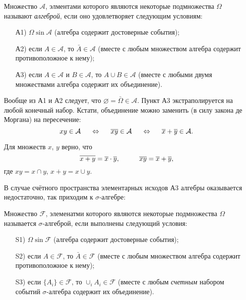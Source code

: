 \begin{to_def}
    Множество $\mathcal A$, элментами которого являются некоторые подмножества $\Omega$ называют \textit{алгеброй}, если оно удовлетворяет следующим условиям:
    \begin{itemize}
        \item[А1)] $\Omega \sin \mathcal A$ 
        (алгебра содержит достоверные события);
        \item[А2)] если $A \in \mathcal A$, то $\bar{A} \in \mathcal A$ 
        (вместе с любым множеством алгебра содержит противоположное к нему);
        \item[А3)] если $A \in \mathcal A$ и $B \in \mathcal A$, то $A \cup B \in \mathcal A$ 
        (вместе с любыми двумя множествами алгебра содержит их объединение).
    \end{itemize}
\end{to_def}


Вообще из А1 и А2 следует, что $\varnothing = \bar{\Omega} \in \mathcal A$. Пункт А3 экстраполируется на любой конечный набор. Кстати, объединение можно заменить (в силу закона де Моргана) на пересечение:
\begin{equation*}
    xy \in \mathcal A
    \hspace{0.5cm} \Leftrightarrow \hspace{0.5cm}
    \overline{xy} \in \mathcal A
    \hspace{0.5cm} \Leftrightarrow \hspace{0.5cm}
    \overline{x} + \overline{y} \in \mathcal A.
\end{equation*}

\begin{to_thr}
    Для множеств $x$, $y$ верно, что
    \begin{equation*}
        \overline{x + y} = \overline{x} \cdot \overline{y},
        \hspace{1 cm}
        \overline{xy} = \overline{x} + \overline{y},
    \end{equation*}
    где $xy = x \cap y$, $x + y = x \cup y$. 
\end{to_thr}

В случае счётного пространства элементарных исходов А3 алгебры оказывается недостаточно, так приходим к $\sigma$-алгебре:
\begin{to_def}
    Множество $\mathcal F$, элеменатми которого являются некоторые подмножества $\Omega$ называется $\sigma$-алгеброй, если выполнены следующий условия:
    \begin{itemize}
        \item[S1)] $\Omega \sin \mathcal F$ 
        (алгебра содержит достоверные события);
        \item[S2)] если $A \in \mathcal F$, то $\bar{A} \in \mathcal F$ 
        (вместе с любым множеством алгебра содержит противоположное к нему);
        \item[S3)] если $\{A_i\} \in \mathcal F$, то $\cup_i A_i \in \mathcal F$  
        (вместе с любым \textit{счетным} набором событий $\sigma$-алгебра содержит их объединение).
    \end{itemize}
\end{to_def}

